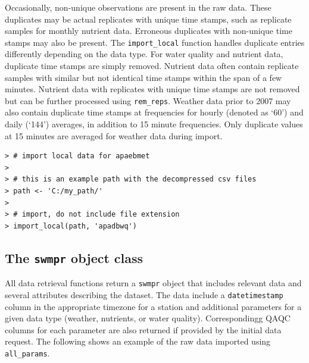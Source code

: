 \documentclass[10pt,letterpaper]{article}\usepackage[]{graphicx}\usepackage[]{color}
\makeatletter
\newenvironment{kframe}{%
 \def\at@end@of@kframe{}%
 \ifinner\ifhmode%
  \def\at@end@of@kframe{\end{minipage}}%
  \begin{minipage}{\columnwidth}%
 \fi\fi%
 \def\FrameCommand##1{\hskip\@totalleftmargin \hskip-\fboxsep
 \colorbox{shadecolor}{##1}\hskip-\fboxsep
     \hskip-\linewidth \hskip-\@totalleftmargin \hskip\columnwidth}%
 \MakeFramed {\advance\hsize-\width
   \@totalleftmargin\z@ \linewidth\hsize
   \@setminipage}}%
 {\par\unskip\endMakeFramed%
 \at@end@of@kframe}
\newenvironment{knitrout}{}{} %
\makeatother
\begin{document}
Occasionally, non-unique observations are present in the raw data.  These duplicates may be actual replicates with unique time stamps, such as replicate samples for monthly nutrient data.  Erroneous duplicates with non-unique time stamps may also be present.  The \texttt{import\_local} function handles duplicate entries differently depending on the data type.  For water quality and nutrient data, duplicate time stamps are simply removed.  Nutrient data often contain replicate samples with similar but not identical time stamps within the span of a few minutes.  Nutrient data with replicates with unique time stamps are not removed but can be further processed using \texttt{rem\_reps}.  Weather data prior to 2007 may also contain duplicate time stamps at frequencies for hourly (denoted as `60') and daily (`144') averages, in addition to 15 minute frequencies.  Only duplicate values at 15 minutes are averaged for weather data during import.  

\begin{knitrout}\small
{}\color{fgcolor}\begin{kframe}
\begin{verbatim}
> # import local data for apaebmet
> 
> # this is an example path with the decompressed csv files
> path <- 'C:/my_path/'
> 
> # import, do not include file extension
> import_local(path, 'apadbwq') 
\end{verbatim}
\end{kframe}
\end{knitrout}

\subsection*{The \texttt{swmpr} object class}

All data retrieval functions return a \texttt{swmpr} object that includes relevant data and several attributes describing the dataset.  The data include a \texttt{datetimestamp} column in the appropriate timezone for a station and additional parameters for a given data type (weather, nutrients, or water quality).  Correspondingg \gls{QAQC} columns for each parameter are also returned if provided by the initial data request.  The following shows an example of the raw data imported using \texttt{all\_params}.
\end{document}
